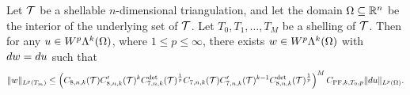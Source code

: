 \documentclass[10pt,a4paper]{article}
\begin{document}
\begin{theorem}\label{theorem:poincarefriedrichsestimate:exterior:contraction}
    Let ${\mathcal T}$ be a shellable $n$-dimensional triangulation, and let the domain $\Omega \subseteq {\mathbb R}^{n}$ be the interior of the underlying set of ${\mathcal T}$.
    Let $T_0, T_1, \dots, T_M$ be a shelling of ${\mathcal T}$.
    Then for any $u \in W^{p}\Lambda^{k}(\Omega)$, where $1 \leq p \leq \infty$, 
    there exists $w \in W^{p}\Lambda^{k}(\Omega)$ with $d w = d u$ 
    such that 
    \begin{align*}
        \| w \|_{L^{p}(T_{m})}
        \leq 
        \left( 
        C_{8,n,k}({\mathcal T})
        C'_{8,n,k}({\mathcal T})^{k} 
        C^{\det}_{7,n,k}({\mathcal T})^{\frac 1 p} 
        C_{7,n,k}({\mathcal T})
        C'_{7,n,k}({\mathcal T})^{k-1} 
        C^{\det}_{8,n,k}({\mathcal T})^{\frac 1 p} 
        \right)^{M}
        C_{{{\rm PF}},k,T_{0},p}
        \| d u \|_{L^{p}(\Omega)}
        .
    \end{align*}
\end{theorem}
\end{document}
